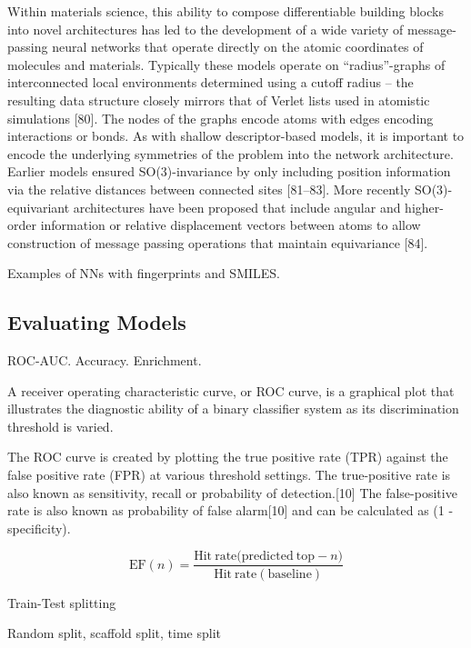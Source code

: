 Within materials science, this ability to compose differentiable building blocks into novel architectures has led to the development of a wide variety of message-passing neural networks that operate directly on the atomic coordinates of molecules and materials. Typically these models operate on “radius”-graphs of interconnected local environments determined using a cutoff radius – the resulting data structure closely mirrors that of Verlet lists used in atomistic simulations [80]. The nodes of the graphs encode atoms with edges encoding interactions or bonds. As with shallow descriptor-based models, it is important to encode the underlying symmetries of the problem into the network architecture. Earlier models ensured SO(3)-invariance by only including position information via the relative distances between connected sites [81–83]. More recently SO(3)-equivariant architectures have been proposed that include angular and higher-order information or relative displacement vectors between atoms to allow construction of message passing operations that maintain equivariance [84].



Examples of NNs with fingerprints and SMILES.

\subsection{Evaluating Models}

ROC-AUC. Accuracy. Enrichment.

A receiver operating characteristic curve, or ROC curve, is a graphical plot that illustrates the diagnostic ability of a binary classifier system as its discrimination threshold is varied.

The ROC curve is created by plotting the true positive rate (TPR) against the false positive rate (FPR) at various threshold settings. The true-positive rate is also known as sensitivity, recall or probability of detection.[10] The false-positive rate is also known as probability of false alarm[10] and can be calculated as (1 - specificity).

\begin{equation}
    \mathrm{EF}(n) = \frac{\mathrm{Hit\: rate (predicted\: top - }n)}{\mathrm{Hit\: rate (baseline)}}
\end{equation}


Train-Test splitting

Random split, scaffold split, time split

